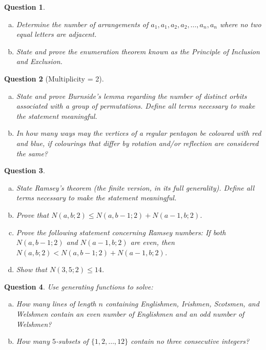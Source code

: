 \documentclass[12]{article}
\newtheorem{question}{Question}
\theoremstyle{definition}
\begin{document}
	\newpage
	
	\begin{question}
		\
		\begin{enumerate}[a)]
			\item Determine the number of arrangements of $a_1, a_1, a_2, a_2, \ldots, a_n, a_n$ where no two equal letters are adjacent.
			\item State and prove the enumeration theorem known as the Principle of Inclusion and Exclusion.
		\end{enumerate}
	\end{question}

	\begin{question}[Multiplicity = 2]
		\
		\begin{enumerate}[a)]
			\item State and prove Burnside's lemma regarding the number of distinct orbits associated with a group of permutations.  Define all terms necessary to make the statement meaningful.
			\item In how many ways may the vertices of a regular pentagon be coloured with red and blue, if colourings that differ by rotation and/or reflection are considered the same?
		\end{enumerate}
	\end{question}

	\begin{question}
		\
		\begin{enumerate}[a)]
			\item State Ramsey's theorem (the finite version, in its full generality).  Define all terms necessary to make the statement meaningful.
			\item Prove that $N(a,b;2) \leq N(a,b-1;2) + N(a-1,b;2)$.
			\item Prove the following statement concerning Ramsey numbers: If both $N(a,b-1;2)$ and $N(a-1,b;2)$ are even, then $N(a,b;2) < N(a,b-1;2) + N(a-1,b;2)$.
			\item Show that $N(3,5;2) \leq 14$.
		\end{enumerate}
	\end{question}

	\begin{question}
		Use generating functions to solve:
		\begin{enumerate}[a)]
			\item How many lines of length $n$ containing Englishmen, Irishmen, Scotsmen, and Welshmen contain an even number of Englishmen and an odd number of Welshmen?
			\item How many $5$-subsets of $\{1, 2, \ldots, 12\}$ contain no three consecutive integers?
		\end{enumerate}
	\end{question}
\end{document}
